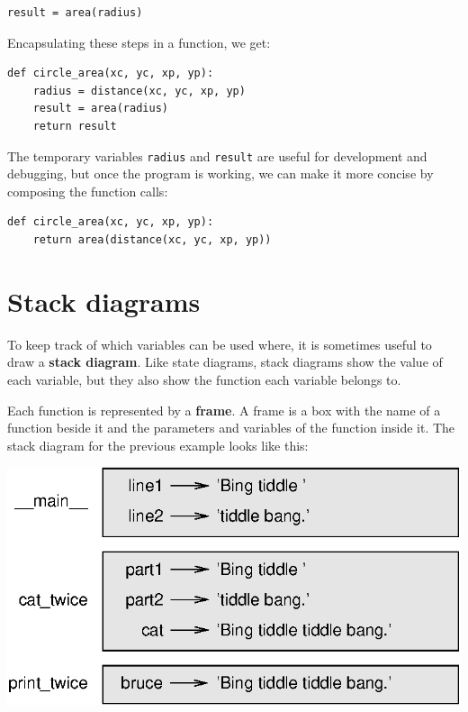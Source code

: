 \documentclass[10pt]{book}
\begin{document}
\beforeverb
\begin{verbatim}
result = area(radius)
\end{verbatim}
\afterverb
%
Encapsulating these steps in a function, we get:


\beforeverb
\begin{verbatim}
def circle_area(xc, yc, xp, yp):
    radius = distance(xc, yc, xp, yp)
    result = area(radius)
    return result
\end{verbatim}
\afterverb
%
The temporary variables {\tt radius} and {\tt result} are useful for
development and debugging, but once the program is working, we can
make it more concise by composing the function calls:

\beforeverb
\begin{verbatim}
def circle_area(xc, yc, xp, yp):
    return area(distance(xc, yc, xp, yp))
\end{verbatim}
\afterverb
%

\section{Stack diagrams}
\label{stackdiagram}

To keep track of which variables can be used where, it is sometimes
useful to draw a {\bf stack diagram}.  Like state diagrams, stack
diagrams show the value of each variable, but they also show the
function each variable belongs to.


Each function is represented by a {\bf frame}.  A frame is a box
with the name of a function
beside it and the parameters and variables of the function inside it.
The stack diagram for the
previous example looks like this:

\beforefig
\centerline{\includegraphics{figs/stack.eps}}
\afterfig
\end{document}
